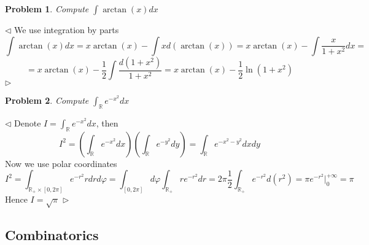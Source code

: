 \documentclass[12pt]{article}
\newtheorem{problem}{Problem}[subsection]
\newenvironment{solution}{\par $\triangleleft$}{$\triangleright$}
\begin{document}
\begin{problem} Compute $\int \arctan(x)dx$
\end{problem}
\begin{solution} We use integration by parts
    $$
        \int\arctan(x)dx
        =x\arctan(x)-\int xd(\arctan(x))
        =x\arctan(x)-\int\frac{x}{1+x^2}dx=
    $$
    $$
        =x\arctan(x)-\frac{1}{2}\int\frac{d(1+x^2)}{1+x^2}
        =x\arctan(x)-\frac{1}{2}\ln(1+x^2)
    $$
\end{solution}

\begin{problem} Compute $\int_{\mathbb{R}} e^{-x^2}dx$
\end{problem}
\begin{solution} Denote $I=\int_{\mathbb{R}} e^{-x^2}dx$, then
    $$
        I^2
        =\left(\int_{\mathbb{R}} e^{-x^2}dx\right)
        \left(\int_{\mathbb{R}} e^{-y^2}dy\right)
        =\int_{\mathbb{R}} e^{-x^2-y^2}dxdy
    $$
    Now we use polar coordinates
    $$
        I^2
        =\int_{\mathbb{R}_+\times[0,2\pi]}e^{-r^2}rdrd\varphi
        =\int_{[0,2\pi]}d\varphi\int_{\mathbb{R}_+}re^{-r^2}dr
        =2\pi\frac{1}{2}\int_{\mathbb{R}_+}e^{-r^2}d(r^2)
        =\pi e^{-r^2}\Biggl|_{0}^{+\infty}=\pi
    $$
    Hence $I=\sqrt{\pi}$
\end{solution}
















\newpage

\subsection{Combinatorics}
\end{document}
